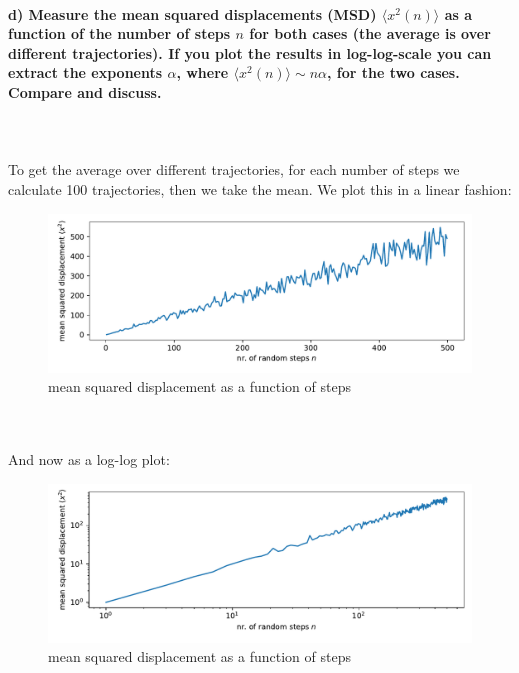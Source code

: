 
\newpage
\paragraph{d) Measure the mean squared displacements (MSD) 
    $\langle x^2(n)\rangle$ as a function of the number of steps $n$ 
    for both cases (the average is over different trajectories). If you 
    plot the results in log-log-scale you can extract the exponents 
    $\alpha$, where $\langle x^2(n)\rangle\sim n\alpha$, for the two 
    cases. Compare and discuss.
} \ \\
\\
    To get the average over different trajectories, for each number of 
    steps we calculate 100 trajectories, then we take the mean. 
    We plot this in a linear fashion: \\
    \begin{figure}[h!]
        \centering
        \includegraphics[width=\textwidth]{./figures/MSD_vs_N.pdf}
        \caption{mean squared displacement as a function of steps}
    \end{figure} \ \\
    \\
    And now as a log-log plot: \\
    \begin{figure}[h!]
        \centering
        \includegraphics[width=\textwidth]{./figures/MSD_vs_N_loglog.pdf}
        \caption{mean squared displacement as a function of steps}
    \end{figure} \ \\
    \\


